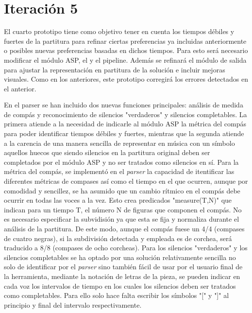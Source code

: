 \section{Iteración 5}

El cuarto prototipo tiene como objetivo tener en cuenta los tiempos débiles y fuertes de la partitura para refinar ciertas preferencias ya incluidas anteriormente o posibles nuevas preferencias basadas en dichos tiempos. Para esto será necesario modificar el módulo ASP, el  y el pipeline. Además se refinará el módulo de salida para ajustar la representación en partitura de la solución e incluir mejoras visuales. Como en los anteriores, este prototipo corregirá los errores detectados en el anterior.

En el parser se han incluido dos nuevas funciones principales: análisis de medida de compás y reconocimiento de silencios "verdaderos" y silencios completables. La primera atiende a la necesidad de indicarle al módulo ASP la métrica del compás para poder identificar tiempos débiles y fuertes, mientras que la segunda atiende a la carencia de una manera sencilla de representar en música con un símbolo aquellos huecos que siendo silencios en la partitura original deben ser completados por el módulo ASP y no ser tratados como silencios en sí. Para la métrica del compás, se implementó en el \textit{parser} la capacidad de itentificar las diferentes métricas de compases así como el tiempo en el que ocurren, aunque por comodidad y sencillez, se ha asumido que un cambio rítmico en el compás debe ocurrir en todas las voces a la vez. Esto crea predicados "measure(T,N)" que indican para un tiempo T, el número N de figuras que componen el compás. No es necesario especificar la subvidisión ya que esta se fija y normaliza durante el análisis de la partitura. De este modo, aunque el compás fuese un 4/4 (compases de cuatro negras), si la subdivisión detectada y empleada es de corchea, será traducido a 8/8 (compases de ocho corcheas). Para los silencios "verdaderos" y los silencios completables se ha optado por una solución relativamente sencilla no solo de identificar por el \textit{parser} sino también fácil de usar por el usuario final de la herramienta, mediante la notación de letras de la pieza, se pueden indicar en cada voz los intervalos de tiempo en los cuales los silencios deben ser tratados como completables. Para ello solo hace falta escribir los símbolos "[" y "]" al principio y final del intervalo respectivamente.

